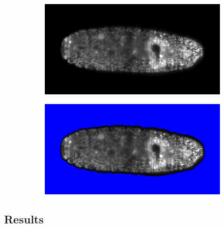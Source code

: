   \begin{figure}
    \centering
    \begin{subfigure}{0.49\textwidth}
      \centering
      \includegraphics[width=\textwidth]{fusion/drosophila_not_masked}
      \caption{}
    \end{subfigure}
    \begin{subfigure}{0.49\textwidth}
      \centering
      \includegraphics[width=\textwidth]{fusion/drosophila_masked}
      \caption{}
    \end{subfigure}
    \label{fig:masking}
  \end{figure}

  


\subsection{Results} 

